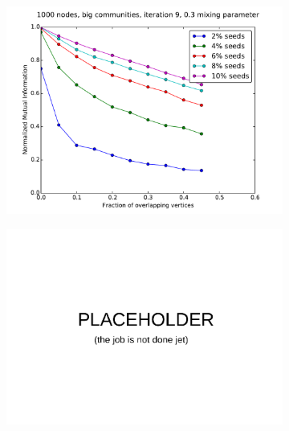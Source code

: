 \begin{figure}
\begin{subfigure}{0.5\textwidth}
    \end{subfigure}%
    \begin{subfigure}{0.5\textwidth}
    \includegraphics[width=\linewidth]{allplots/overlap_iter_3mu_b.pdf}
    \end{subfigure}
    \begin{subfigure}{0.5\textwidth}
    \includegraphics[width=\linewidth]{allplots/placeholder.pdf}
    \end{subfigure}%
    \begin{subfigure}{0.5\textwidth}

\end{subfigure}
\end{figure}
